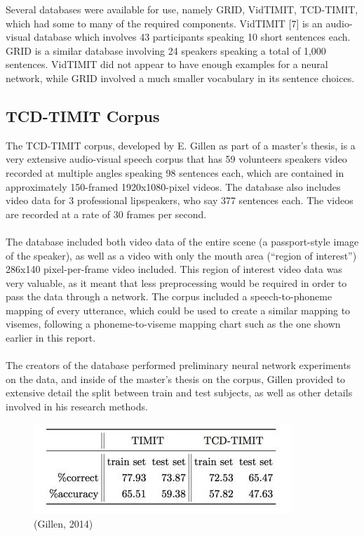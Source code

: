\documentclass[12pt,twoside]{report}
\begin{document}
Several databases were available for use, namely GRID, VidTIMIT, TCD-TIMIT, which had some to many of the required components. VidTIMIT [7] is an audio-visual database which involves 43 participants speaking 10 short sentences each. GRID is a similar database involving 24 speakers speaking a total of 1,000 sentences. VidTIMIT did not appear to have enough examples for a neural network, while GRID involved a much smaller vocabulary in its sentence choices. 

		\subsection{TCD-TIMIT Corpus}

The TCD-TIMIT corpus, developed by E. Gillen as part of a master’s thesis, is a very extensive audio-visual speech corpus that has 59 volunteers speakers video recorded at multiple angles speaking 98 sentences each, which are contained in approximately 150-framed 1920x1080-pixel videos. The database also includes video data for 3 professional lipspeakers, who say 377 sentences each. The videos are recorded at a rate of 30 frames per second. 
\\ \\
The database included both video data of the entire scene (a passport-style image of the speaker), as well as a video with only the mouth area (“region of interest”) 286x140 pixel-per-frame video included. This region of interest video data was very valuable, as it meant that less preprocessing would be required in order to pass the data through a network. The corpus included a speech-to-phoneme mapping of every utterance, which could be used to create a similar mapping to visemes, following a phoneme-to-viseme mapping chart such as the one shown earlier in this report. 
\\ \\
The creators of the database performed preliminary neural network experiments on the data, and inside of the master's thesis on the corpus, Gillen provided to extensive detail the split between train and test subjects, as well as other details involved in his research methods.

\begin{figure}[tb]
\centering
\includegraphics[width = 0.4\hsize]{./figures/tcdtimitaccuracy}
\caption{(Gillen, 2014)}
\label{fig:tcdtimit1}
\end{figure} 
\end{document}
